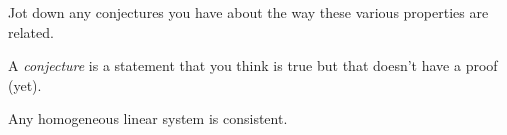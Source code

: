\documentclass[hidelinks,12pt,handout]{ximera}
\begin{document}
\begin{question} Jot down any conjectures you have about the way these various properties are related. \begin{hint} A \textit{conjecture} is a statement that you think is true but that doesn't have a proof (yet). 
\end{hint}
\vfill
\begin{prompt}
	\begin{freeResponse}
			Any homogeneous linear system is consistent.
	\end{freeResponse}
\end{prompt}
\end{question}
\end{document}
